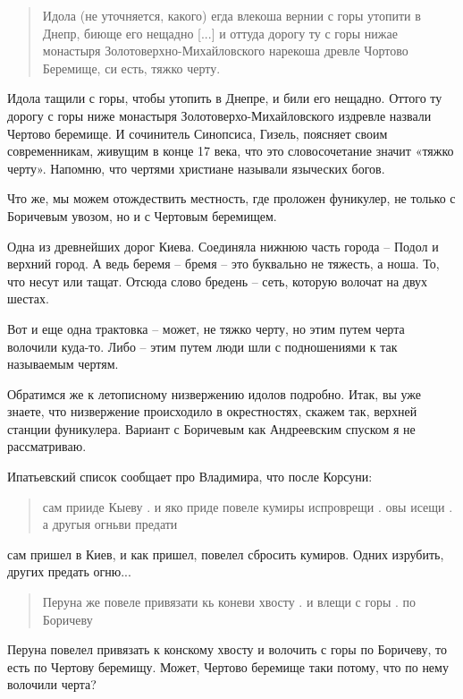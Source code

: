 \documentclass[a5paper,11pt,openany]{article}
\begin{document}
\begin{quotation}
\noindent Идола (не уточняется, какого) егда влекоша вернии с горы утопити в Днепр, биюще его нещадно [...] и оттуда дорогу ту с горы нижае
монастыря Золотоверхно-Михайловского нарекоша древле Чортово Беремище, си есть, тяжко черту.
\end{quotation}

Идола тащили с горы, чтобы утопить в Днепре, и били его нещадно. Оттого ту дорогу с горы ниже монастыря Золотоверхо-Михайловского издревле назвали Чертово беремище. И сочинитель Синопсиса, Гизель, поясняет своим современникам, живущим в конце 17 века, что это словосочетание значит «тяжко черту». Напомню, что чертями христиане называли языческих богов.

Что же, мы можем отождествить местность, где проложен фуникулер, не только с Боричевым увозом, но и с Чертовым беремищем.

Одна из древнейших дорог Киева. Соединяла нижнюю часть города – Подол и верхний город. А ведь беремя – бремя – это буквально не тяжесть, а ноша. То, что несут или тащат. Отсюда слово бредень – сеть, которую волочат на двух шестах.

Вот и еще одна трактовка – может, не тяжко черту, но этим путем черта волочили куда-то. Либо – этим путем люди шли с подношениями к так называемым чертям.

Обратимся же к летописному низвержению идолов подробно. Итак, вы уже знаете, что низвержение происходило в окрестностях, скажем так, верхней станции фуникулера. Вариант с Боричевым как Андреевским спуском я не рассматриваю.

Ипатьевский список сообщает про Владимира, что после Корсуни:

\begin{quotation}
\noindent сам прииде Кыеву . и яко приде
повеле кумиры испроврещи . овы исещи . а другыя огньви предати
\end{quotation}

сам пришел в Киев, и как пришел, повелел сбросить кумиров. Одних изрубить, других предать огню... 

\begin{quotation}
\noindent Перуна же повеле привязати кь коневи хвосту . и влещи с горы . по Боричеву 
\end{quotation}

Перуна повелел привязать к конскому хвосту и волочить с горы по Боричеву, то есть по Чертову беремищу. Может, Чертово беремище таки потому, что по нему волочили черта?
\end{document}
